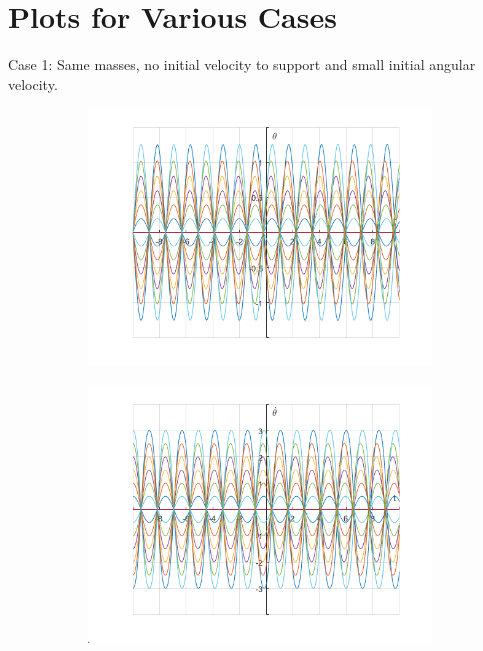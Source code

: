 \documentclass{article}
\begin{document}
 \section{Plots for Various Cases}
 \centering
	Case 1:
	Same masses, no initial velocity to support and small initial angular velocity.
	\newline
	\begin{figure}[h!]
		\graphicspath{{./SmallOscillations/S1} }
		\centering
		\begin{subfigure}[b]{0.48\linewidth}
		\includegraphics[width=\linewidth]{./F1.png}
		\end{subfigure}
			\begin{subfigure}[b]{0.48\linewidth}
		\includegraphics[width=\linewidth]{./F2.png}
	\end{subfigure}
	\end{figure}
\end{document}
